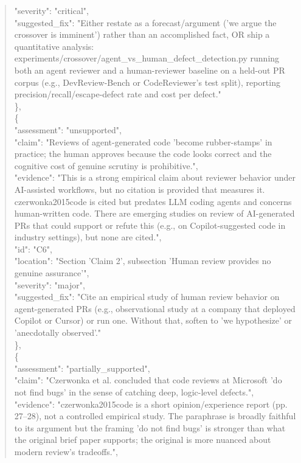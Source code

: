 \documentclass[11pt]{article}
\begin{document}
\begin{quote}
      "severity": "critical",\\
      "suggested\_fix": "Either restate as a forecast/argument ('we argue the crossover is imminent') rather than an accomplished fact, OR ship a quantitative analysis: experiments/crossover/agent\_vs\_human\_defect\_detection.py running both an agent reviewer and a human-reviewer baseline on a held-out PR corpus (e.g., DevReview-Bench or CodeReviewer's test split), reporting precision/recall/escape-defect rate and cost per defect."\\
    \},\\
    \{\\
      "assessment": "unsupported",\\
      "claim": "Reviews of agent-generated code 'become rubber-stamps' in practice; the human approves because the code looks correct and the cognitive cost of genuine scrutiny is prohibitive.",\\
      "evidence": "This is a strong empirical claim about reviewer behavior under AI-assisted workflows, but no citation is provided that measures it. czerwonka2015code is cited but predates LLM coding agents and concerns human-written code. There are emerging studies on review of AI-generated PRs that could support or refute this (e.g., on Copilot-suggested code in industry settings), but none are cited.",\\
      "id": "C6",\\
      "location": "Section 'Claim 2', subsection 'Human review provides no genuine assurance'",\\
      "severity": "major",\\
      "suggested\_fix": "Cite an empirical study of human review behavior on agent-generated PRs (e.g., observational study at a company that deployed Copilot or Cursor) or run one. Without that, soften to 'we hypothesize' or 'anecdotally observed'."\\
    \},\\
    \{\\
      "assessment": "partially\_supported",\\
      "claim": "Czerwonka et al. concluded that code reviews at Microsoft 'do not find bugs' in the sense of catching deep, logic-level defects.",\\
      "evidence": "czerwonka2015code is a short opinion/experience report (pp. 27--28), not a controlled empirical study. The paraphrase is broadly faithful to its argument but the framing 'do not find bugs' is stronger than what the original brief paper supports; the original is more nuanced about modern review's tradeoffs.",\\

\end{quote}
\end{document}
